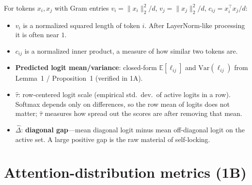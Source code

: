 \documentclass[11pt,a4paper]{report}
\begin{document}
For tokens $x_i,x_j$ with Gram entries $v_i=\|x_i\|_2^2/d$, $v_j=\|x_j\|_2^2/d$, $c_{ij}=x_i^\top x_j/d$:
\begin{itemize}[leftmargin=*]
  \item $v_i$ is a normalized squared length of token $i$. After LayerNorm-like processing it is often near $1$.
  \item $c_{ij}$ is a normalized inner product, a measure of how similar two tokens are.
  \item \textbf{Predicted logit mean/variance}: closed-form $\mathbb{E}[\ell_{ij}]$ and $\mathrm{Var}(\ell_{ij})$ from Lemma~1 / Proposition~1 (verified in 1A).
  \item $\widehat\tau$: row-centered logit scale (empirical std.\ dev.\ of active logits in a row). Softmax depends only on differences, so the row mean of logits does not matter; $\widehat\tau$ measures how spread out the scores are after removing that mean.
  \item $\widehat\Delta$: \textbf{diagonal gap}---mean diagonal logit minus mean off-diagonal logit on the active set. A large positive gap is the raw material of self-locking.
\end{itemize}

\section{Attention-distribution metrics (1B)}
\end{document}
